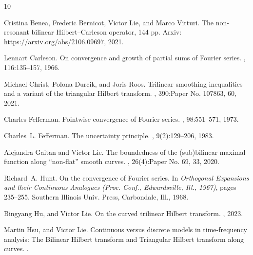 \documentclass[a4paper,reqno]{amsart}
\numberwithin{equation}{section}
\theoremstyle{definition}
\begin{document}
\begin{thebibliography}{10}


Cristina Benea, Frederic Bernicot, Victor Lie, and Marco Vitturi.
\newblock The non-resonant bilinear {H}ilbert--{C}arleson operator, 144 pp.
\newblock Arxiv: https://arxiv.org/abs/2106.09697, 2021.


Lennart Carleson.
\newblock On convergence and growth of partial sums of {F}ourier series.
, 116:135--157, 1966.


Michael Christ, Polona Durcik, and Joris Roos.
\newblock Trilinear smoothing inequalities and a variant of the triangular
  {H}ilbert transform.
, 390:Paper No. 107863, 60, 2021.



Charles Fefferman.
\newblock Pointwise convergence of {F}ourier series.
, 98:551--571, 1973.


Charles~L. Fefferman.
\newblock The uncertainty principle.
, 9(2):129--206, 1983.


Alejandra Gaitan and Victor Lie.
\newblock The boundedness of the (sub)bilinear maximal function along
  ``non-flat'' smooth curves.
, 26(4):Paper No. 69, 33, 2020.

Richard~A. Hunt.
\newblock On the convergence of {F}ourier series.
\newblock In {\em Orthogonal {E}xpansions and their {C}ontinuous {A}nalogues
  ({P}roc. {C}onf., {E}dwardsville, {I}ll., 1967)}, pages 235--255. Southern
  Illinois Univ. Press, Carbondale, Ill., 1968.

Bingyang Hu, and Victor Lie.
\newblock On the curved trilinear {H}ilbert transform.
, 2023.


Martin Hsu, and Victor Lie.
\newblock Continuous versus discrete models in time-frequency analysis: The Bilinear Hilbert transform and Triangular Hilbert transform along curves.
.


\end{thebibliography}
\end{document}
